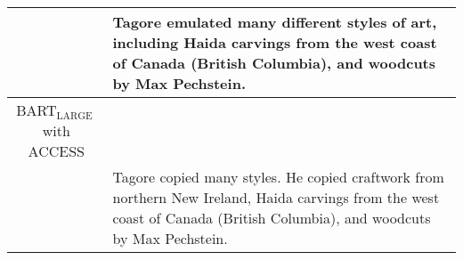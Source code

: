 \documentclass[11pt]{article}
\newcommand{\control}{\textsc{Control Prefixes}\xspace}
\newcommand{\bartl}{BART$_{\text {LARGE }}$}
\begin{document}
\begin{table*}[bth!]
\begin{tabular}{c|p{}}
& Tagore emulated many different styles of art, including Haida carvings from the west coast of Canada (British Columbia), and woodcuts by Max Pechstein. \\ \hline
\bartl with ACCESS  \\

& Tagore copied many styles. He copied craftwork from northern New Ireland, Haida carvings from the west coast of Canada (British Columbia), and woodcuts by Max Pechstein.
\\ \midrule \hline



  \end{tabular}
  \caption{\textbf{\emph{Fixed-LM} vs fine-tuned controlled text simplification}. \control  and \bartl with ACCESS \citep{MUSS} generated simplifications chosen from the ASSET Corpus test set. $^\dagger$Note, this is one random gold reference out of 10 for each example. The examples shown for \control and \bartl with ACCESS are also randomly selected from one of the five model outputs.\label{tab:app_simpcont}}
    

\end{table*}
\end{document}
